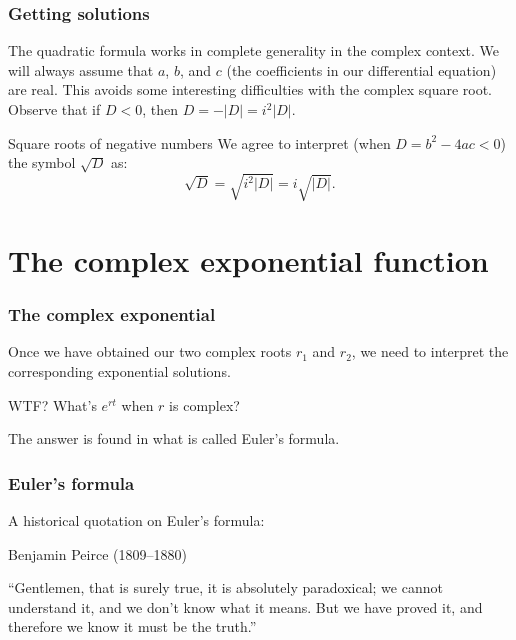 \begin{frame}

\frametitle{Getting solutions}
\label{gettingsolutions}

The quadratic formula works in complete generality in the complex context. We will always assume that $a$, $b$, and $c$ (the coefficients in our differential equation) are real. This avoids some interesting difficulties with the complex square root. Observe that if $D < 0$, then $D = -|D| = i^2 |D|$.

 \begin{block}{Square roots of negative numbers} 
 We agree to interpret (when $D = b^2 - 4ac < 0$) the symbol $\sqrt{D}$ as:
 \[
      \sqrt{D} = \sqrt{i^2 |D|} = i \sqrt{|D|}.
    \]
  \end{block} 

\end{frame}

\section{The complex exponential function}
\label{thecomplexexponentialfunction}

\begin{frame}

\frametitle{The complex exponential}
\label{thecomplexexponential}

Once we have obtained our two complex roots $r_1$ and $r_2$, we need to interpret the corresponding exponential solutions.
  \pause 
  \begin{block}{WTF?} 
 What's $e^{rt}$ when $r$ is complex?
  \end{block} 

The answer is found in what is called Euler's formula.

\end{frame}

\begin{frame}

\frametitle{Euler's formula}
\label{eulersformula}

A historical quotation on Euler's formula:

 \begin{block}{Benjamin Peirce (1809--1880)} 

``Gentlemen, that is surely true,
it is absolutely paradoxical;
we cannot understand it,
and we don't know what it means.
But we have proved it,
and therefore we know it must be the truth.''
 \end{block} 

\end{frame}

